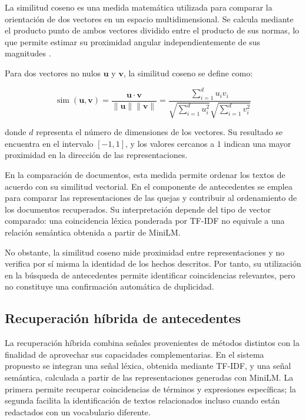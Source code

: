 La similitud coseno es una medida matemática utilizada para comparar la orientación de dos vectores en un espacio multidimensional. Se calcula mediante el producto punto de ambos vectores dividido entre el producto de sus normas, lo que permite estimar su proximidad angular independientemente de sus magnitudes \cite{manning2008ir}.

Para dos vectores no nulos $\mathbf{u}$ y $\mathbf{v}$, la similitud coseno se define como:

\begin{equation}
    \operatorname{sim}(\mathbf{u},\mathbf{v})
    =
    \frac{\mathbf{u}\cdot\mathbf{v}}
    {\lVert\mathbf{u}\rVert\lVert\mathbf{v}\rVert}
    =
    \frac{\displaystyle\sum_{i=1}^{d}u_i v_i}
    {\sqrt{\displaystyle\sum_{i=1}^{d}u_i^2}
     \sqrt{\displaystyle\sum_{i=1}^{d}v_i^2}}
    \label{eq:similitud_coseno}
\end{equation}

donde $d$ representa el número de dimensiones de los vectores. Su resultado se encuentra en el intervalo $[-1,1]$, y los valores cercanos a $1$ indican una mayor proximidad en la dirección de las representaciones.

En la comparación de documentos, esta medida permite ordenar los textos de acuerdo con su similitud vectorial. En el componente de antecedentes se emplea para comparar las representaciones de las quejas y contribuir al ordenamiento de los documentos recuperados. Su interpretación depende del tipo de vector comparado: una coincidencia léxica ponderada por TF-IDF no equivale a una relación semántica obtenida a partir de MiniLM.

No obstante, la similitud coseno mide proximidad entre representaciones y no verifica por sí misma la identidad de los hechos descritos. Por tanto, su utilización en la búsqueda de antecedentes permite identificar coincidencias relevantes, pero no constituye una confirmación automática de duplicidad.

\subsection{Recuperación híbrida de antecedentes}

La recuperación híbrida combina señales provenientes de métodos distintos con la finalidad de aprovechar sus capacidades complementarias. En el sistema propuesto se integran una señal léxica, obtenida mediante TF-IDF, y una señal semántica, calculada a partir de las representaciones generadas con MiniLM. La primera permite recuperar coincidencias de términos y expresiones específicas; la segunda facilita la identificación de textos relacionados incluso cuando están redactados con un vocabulario diferente.

